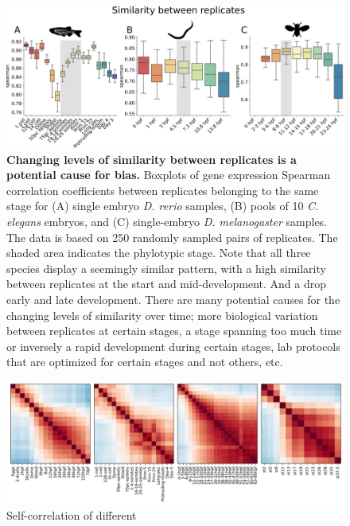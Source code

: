 \begin{figure}[H]
    \includegraphics[width=\linewidth]{ch.hourglass/images/within_timepoint.png}
    \caption{\textbf{Changing levels of similarity between replicates is a potential cause for bias.} Boxplots of gene expression Spearman correlation coefficients between replicates belonging to the same stage for (A) single embryo \textit{D. rerio} samples, (B) pools of 10 \textit{C. elegans} embryos, and (C) single-embryo \textit{D. melanogaster} samples. The data is based on 250 randomly sampled pairs of replicates. The shaded area indicates the phylotypic stage. Note that all three species display a seemingly similar pattern, with a high similarity between replicates at the start and mid-development. And a drop early and late development. There are many potential causes for the changing levels of similarity over time; more biological variation between replicates at certain stages, a stage spanning too much time or inversely a rapid development during certain stages, lab protocols that are optimized for certain stages and not others, etc.}
    \label{fig:within_timepoint}
\end{figure}

\begin{figure}[H]
    \includegraphics[width=\linewidth]{ch.hourglass/images/within_species.png}
    \caption{Self-correlation of different}
    \label{fig:withinspecies}
\end{figure}

